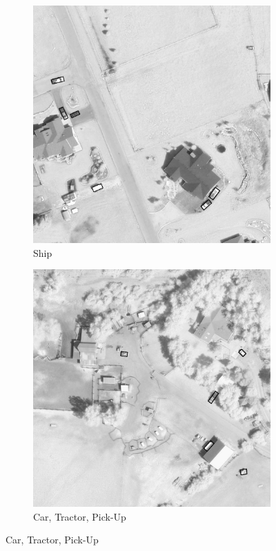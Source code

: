 \begin{figure}[h!]
    \begin{subfigure}[t]{0.38\textwidth}
        \centering
        \includegraphics[width=\linewidth]{images/015Results/03ablation/comp_images/ground_truth/509.png}
        \caption{Ship}
    \end{subfigure}
    \begin{subfigure}[t]{0.38\textwidth}
        \centering
        \includegraphics[width=\linewidth]{images/015Results/03ablation/comp_images/ground_truth/523.png}
        \caption{Car, Tractor, Pick-Up}
    \end{subfigure}
    

\end{figure}
